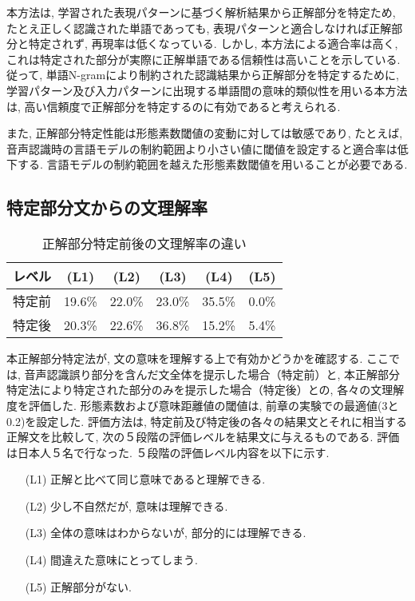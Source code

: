 \newpage

本方法は, 学習された表現パターンに基づく解析結果から正解部分を特定ため, 
たとえ正しく認識された単語であっても, 表現パターンと適合しなければ正解部分と特定されず, 再現率は低くなっている. 
しかし, 本方法による適合率は高く, これは特定された部分が実際に正解単語である信頼性は高いことを示している. 
従って, 単語N-gramにより制約された認識結果から正解部分を特定するために, 学習パターン及び入力パターンに出現する単語間の意味的類似性を用いる本方法は, 高い信頼度で正解部分を特定するのに有効であると考えられる. 

また, 正解部分特定性能は形態素数閾値の変動に対しては敏感であり, たとえば, 音声認識時の言語モデルの制約範囲より小さい値に閾値を設定すると適合率は低下する. 言語モデルの制約範囲を越えた形態素数閾値を用いることが必要である. 

\vspace{-3mm}
\subsection{特定部分文からの文理解率}
\vspace{-1mm}

\begin{table}
\caption{正解部分特定前後の文理解率の違い}
\label{tab:eval_under}
\begin{center}
 \begin{tabular}{|c||c|c|c|c|c|}
\hline
レベル       & (L1)   & (L2)   & (L3)   & (L4)   & (L5)  \\ \hline \hline
特定前       & 19.6\% & 22.0\% & 23.0\% & 35.5\% & 0.0\%   \\ \hline
特定後       & 20.3\% & 22.6\% & 36.8\% & 15.2\% & 5.4\% \\
\hline
 \end{tabular}
\end{center}
\end{table}

本正解部分特定法が, 文の意味を理解する上で有効かどうかを確認する. 
ここでは, 音声認識誤り部分を含んだ文全体を提示した場合（特定前）と, 本正解部分特定法により特定された部分のみを提示した場合（特定後）との, 各々の文理解度を評価した. 
形態素数および意味距離値の閾値は, 前章の実験での最適値(3と0.2)を設定した. 
評価方法は, 特定前及び特定後の各々の結果文とそれに相当する正解文を比較して, 次の５段階の評価レベルを結果文に与えるものである. 評価は日本人５名で行なった. ５段階の評価レベル内容を以下に示す. 
\begin{itemize}
\item[　(L1)] 正解と比べて同じ意味であると理解できる. 
\vspace*{-2mm}
\item[　(L2)] 少し不自然だが, 意味は理解できる. 
\vspace*{-2mm}
\item[　(L3)] 全体の意味はわからないが, 部分的には理解できる. 
\vspace*{-2mm}
\item[　(L4)] 間違えた意味にとってしまう. 
\vspace*{-2mm}
\item[　(L5)] 正解部分がない. 
\end{itemize}

